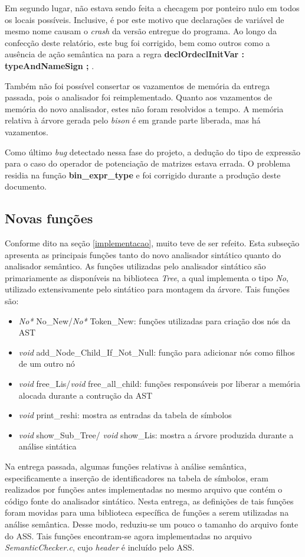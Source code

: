 \documentclass[
	article,			%
	11pt,				%
	oneside,			%
	a4paper,			%
	english,			%
	brazil,				%
	sumario=tradicional
	]{abntex2}
\renewcommand{\it}[1]{\textit{#1}}
\renewcommand{\bf}[1]{\textbf{#1}}
\begin{document}
Em segundo lugar, não estava sendo feita a checagem por ponteiro nulo em todos os locais possíveis. Inclusive, é por este motivo que declarações de variável de mesmo nome causam o \it{crash} da versão entregue do programa. Ao longo da confecção deste relatório, este bug foi corrigido, bem como outros como a ausência de ação semântica na para a regra \bf{declOrdeclInitVar : typeAndNameSign ;} .

Também não foi possível consertar os vazamentos de memória da entrega passada, pois o analisador foi reimplementado. Quanto aos vazamentos de memória do novo analisador, estes não foram resolvidos a tempo. A memória relativa à árvore gerada pelo \it{bison} é em grande parte liberada, mas há vazamentos.

Como último \it{bug} detectado nessa fase do projeto, a dedução do tipo de expressão para o caso do operador de potenciação de matrizes estava errada. O problema residia na função \bf{bin\_expr\_type} e foi corrigido durante a produção deste documento.

\subsection{Novas funções}

Conforme dito na seção \ref{implementacao}, muito teve de ser refeito. Esta subseção apresenta as principais funções tanto do novo analisador sintático quanto do analisador semântico. As funções utilizadas pelo analisador sintático são primariamente as disponíveis na biblioteca \it{Tree}, a qual implementa o tipo \it{No}, utilizado extensivamente pelo sintático para montagem da árvore. Tais funções são:
\begin{itemize}
	\item \it{No*} No\_New/\it{No*} Token\_New: funções utilizadas para criação dos nós da AST
	\item \it{void} add\_Node\_Child\_If\_Not\_Null: função para adicionar nós como filhos de um outro nó
	\item \it{void} free\_Lis/\it{void} free\_all\_child: funções responsáveis por liberar a memória alocada  durante a contrução da AST
	\item \it{void} print\_reshi: mostra as entradas da tabela de símbolos
	\item \it{void} show\_Sub\_Tree/ \it{void} show\_Lis: mostra a árvore produzida durante a análise sintática
\end{itemize}

Na entrega passada, algumas funções relativas à análise semântica, especificamente a inserção de identificadores na tabela de símbolos, eram realizados por funções antes implementadas no mesmo arquivo que contém o código fonte do analisador sintático. Nesta entrega, as definições de tais funções foram movidas para uma biblioteca específica de funções a serem utilizadas na análise semântica. Desse modo, reduziu-se um pouco o tamanho do arquivo fonte do ASS. Tais funções encontram-se agora implementadas no arquivo \it{SemanticChecker.c}, cujo \it{header} é incluído pelo ASS.
\end{document}
